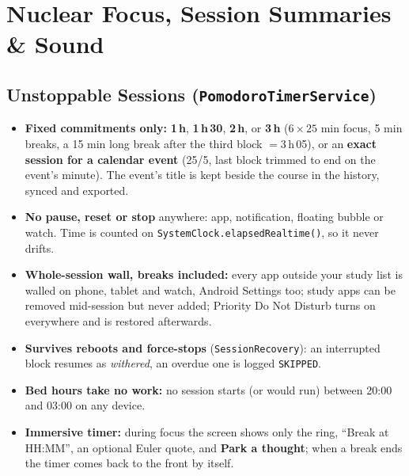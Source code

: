 \documentclass[11pt,a4paper]{article}
\begin{document}
\section{Nuclear Focus, Session Summaries \& Sound}

\subsection{Unstoppable Sessions (\texttt{PomodoroTimerService})}
\begin{itemize}
  \item \textbf{Fixed commitments only:} \textbf{1\,h}, \textbf{1\,h\,30}, \textbf{2\,h}, or \textbf{3\,h} ($6 \times 25$ min focus, 5 min breaks, a 15 min long break after the third block $= 3$\,h\,05), or an \textbf{exact session for a calendar event} (25/5, last block trimmed to end on the event's minute). The event's title is kept beside the course in the history, synced and exported.
  \item \textbf{No pause, reset or stop} anywhere: app, notification, floating bubble or watch. Time is counted on \texttt{SystemClock.elapsedRealtime()}, so it never drifts.
  \item \textbf{Whole-session wall, breaks included:} every app outside your study list is walled on phone, tablet and watch, Android Settings too; study apps can be removed mid-session but never added; Priority Do Not Disturb turns on everywhere and is restored afterwards.
  \item \textbf{Survives reboots and force-stops} (\texttt{SessionRecovery}): an interrupted block resumes as \emph{withered}, an overdue one is logged \texttt{SKIPPED}.
  \item \textbf{Bed hours take no work:} no session starts (or would run) between 20:00 and 03:00 on any device.
  \item \textbf{Immersive timer:} during focus the screen shows only the ring, ``Break at HH:MM'', an optional Euler quote, and \textbf{Park a thought}; when a break ends the timer comes back to the front by itself.
\end{itemize}
\end{document}
